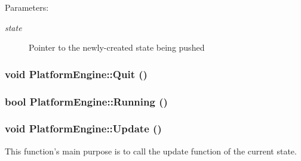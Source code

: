 \begin{Desc}
\item[Parameters:]
\begin{description}
\item[{\em state}]Pointer to the newly-created state being pushed \end{description}
\end{Desc}
\hypertarget{class_platform_engine_dbcdd91813cabbe51bb2f86eb23e772a}{
\subsubsection[{Quit}]{\setlength{\rightskip}{0pt plus 5cm}void PlatformEngine::Quit ()}}
\label{class_platform_engine_dbcdd91813cabbe51bb2f86eb23e772a}


\hypertarget{class_platform_engine_31ec37c0222f4694cc3c0e819e143038}{
\subsubsection[{Running}]{\setlength{\rightskip}{0pt plus 5cm}bool PlatformEngine::Running ()}}
\label{class_platform_engine_31ec37c0222f4694cc3c0e819e143038}


\hypertarget{class_platform_engine_d3ab75304226ad3fcac6b66ce3cedbc7}{
\subsubsection[{Update}]{\setlength{\rightskip}{0pt plus 5cm}void PlatformEngine::Update ()}}
\label{class_platform_engine_d3ab75304226ad3fcac6b66ce3cedbc7}


This function's main purpose is to call the update function of the current state. 